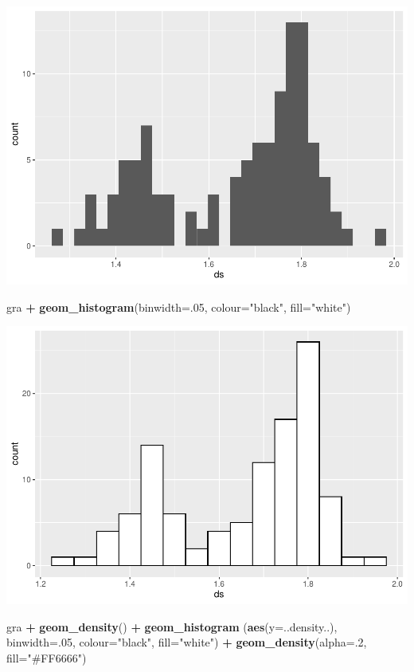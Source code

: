 \documentclass[
]{book}
\newenvironment{Shaded}{\begin{snugshade}}{\end{snugshade}}
\newcommand{\DataTypeTok}[1]{\textcolor[rgb]{0.13,0.29,0.53}{#1}}
\newcommand{\DecValTok}[1]{\textcolor[rgb]{0.00,0.00,0.81}{#1}}
\newcommand{\KeywordTok}[1]{\textcolor[rgb]{0.13,0.29,0.53}{\textbf{#1}}}
\newcommand{\NormalTok}[1]{#1}
\newcommand{\OperatorTok}[1]{\textcolor[rgb]{0.81,0.36,0.00}{\textbf{#1}}}
\newcommand{\StringTok}[1]{\textcolor[rgb]{0.31,0.60,0.02}{#1}}
\begin{document}
\includegraphics{TudodoR_files/figure-latex/unnamed-chunk-192-1.pdf}

\begin{Shaded}
\begin{Highlighting}[]
\NormalTok{gra }\OperatorTok{+}\StringTok{  }\KeywordTok{geom_histogram}\NormalTok{(}\DataTypeTok{binwidth=}\NormalTok{.}\DecValTok{05}\NormalTok{, }\DataTypeTok{colour=}\StringTok{"black"}\NormalTok{, }\DataTypeTok{fill=}\StringTok{"white"}\NormalTok{)}
\end{Highlighting}
\end{Shaded}

\includegraphics{TudodoR_files/figure-latex/unnamed-chunk-193-1.pdf}

\begin{Shaded}
\begin{Highlighting}[]
\NormalTok{gra }\OperatorTok{+}\StringTok{ }\KeywordTok{geom_density}\NormalTok{() }\OperatorTok{+}\StringTok{ }
\StringTok{  }\KeywordTok{geom_histogram}\NormalTok{ (}\KeywordTok{aes}\NormalTok{(}\DataTypeTok{y=}\NormalTok{..density..),              }\DataTypeTok{binwidth=}\NormalTok{.}\DecValTok{05}\NormalTok{,}
    \DataTypeTok{colour=}\StringTok{"black"}\NormalTok{, }\DataTypeTok{fill=}\StringTok{"white"}\NormalTok{) }\OperatorTok{+}
\StringTok{    }\KeywordTok{geom_density}\NormalTok{(}\DataTypeTok{alpha=}\NormalTok{.}\DecValTok{2}\NormalTok{, }\DataTypeTok{fill=}\StringTok{"#FF6666"}\NormalTok{)}
\end{Highlighting}
\end{Shaded}
\end{document}
